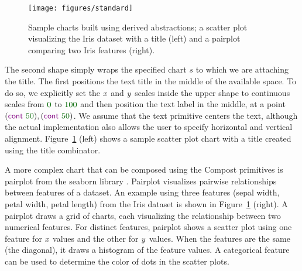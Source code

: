\documentclass{jfp}
\newcommand{\X}{\emph{x}\ }
\newcommand{\Y}{\emph{y}\ }
\newcommand{\num}[1]{\textcolor{numclr}{#1}}
\newcommand{\ident}[1]{\textnormal{\textcolor{idclr}{\sffamily #1}}}
\newcommand{\kvd}[1]{\textnormal{\textcolor{kvdclr}{\sffamily #1}}}
\begin{document}
\begin{figure}
  \texttt{[image: figures/standard]}
  \vspace{0.25em}
  \caption{Sample charts built using derived abstractions; a scatter plot visualizing the Iris dataset with a title (left) and a pairplot comparing two Iris features (right).}
  \label{fig:standard}
\end{figure}

The second shape simply wraps the specified chart $s$ to which we are attaching the title. The first
positions the text title in the middle of the available space. To do so, we explicitly set the \X and
\Y scales inside the upper shape to continuous scales from $\num{0}$ to $\num{100}$ and then position
the text label in the middle, at a point $(\kvd{cont}~\num{50}), (\kvd{cont}~\num{50})$. We assume
that the \kvd{text} primitive centers the text, although the actual implementation also allows the
user to specify horizontal and vertical alignment.
Figure~\ref{fig:standard} (left) shows a sample scatter plot chart with a title created using the
\ident{title} combinator.

A more complex chart that can be composed using the Compost primitives is pairplot from the seaborn
library \cite{seaborn}. Pairplot visualizes pairwise relationships between features of a dataset.
An example using three features (sepal width, petal width, petal length) from the Iris dataset is shown
in Figure~\ref{fig:standard} (right).
A pairplot draws a grid of charts, each visualizing the relationship between two numerical features. For distinct
features, pairplot shows a scatter plot using one feature for \X values and the other for \Y values.
When the features are the same (the diagonal), it draws a histogram of the feature values.
A categorical feature can be used to determine the color of dots in the scatter plots.
\end{document}
